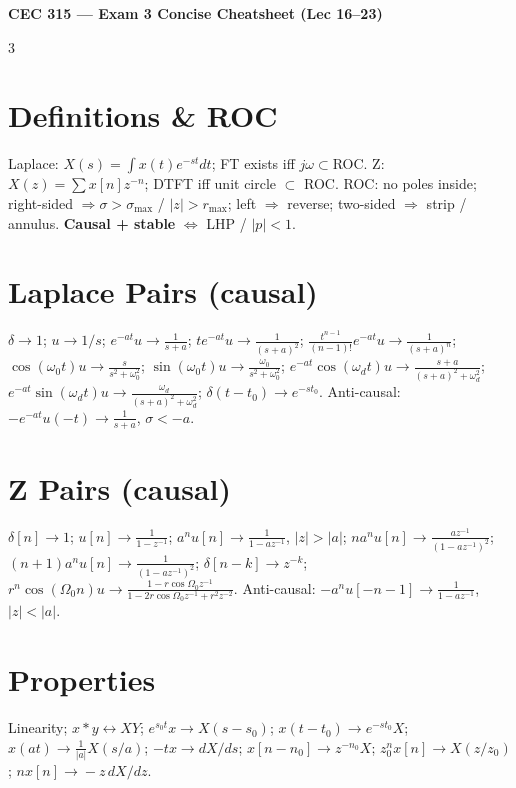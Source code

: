 \documentclass[9pt,landscape]{extarticle}
\begin{document}
\scriptsize
\begin{center}\textbf{CEC 315 --- Exam 3 Concise Cheatsheet (Lec 16--23)}\end{center}

\begin{multicols*}{3}

\section*{Definitions \& ROC}
Laplace: $X(s)=\!\int x(t)e^{-st}dt$; FT exists iff $j\omega\!\subset\!$ROC.
Z: $X(z)=\!\sum x[n]z^{-n}$; DTFT iff unit circle $\subset$ ROC.
ROC: no poles inside; right-sided $\Rightarrow \sigma>\sigma_{\max}$ / $|z|>r_{\max}$; left $\Rightarrow$ reverse; two-sided $\Rightarrow$ strip / annulus. \textbf{Causal + stable} $\Leftrightarrow$ LHP / $|p|<1$.

\section*{Laplace Pairs (causal)}
$\delta\!\to\!1$; $u\!\to\!1/s$; $e^{-at}u\!\to\!\tfrac{1}{s+a}$; $te^{-at}u\!\to\!\tfrac{1}{(s+a)^2}$; $\tfrac{t^{n-1}}{(n-1)!}e^{-at}u\!\to\!\tfrac{1}{(s+a)^n}$; $\cos(\omega_0 t)u\!\to\!\tfrac{s}{s^2+\omega_0^2}$; $\sin(\omega_0 t)u\!\to\!\tfrac{\omega_0}{s^2+\omega_0^2}$; $e^{-at}\cos(\omega_d t)u\!\to\!\tfrac{s+a}{(s+a)^2+\omega_d^2}$; $e^{-at}\sin(\omega_d t)u\!\to\!\tfrac{\omega_d}{(s+a)^2+\omega_d^2}$; $\delta(t{-}t_0)\!\to\!e^{-st_0}$. Anti-causal: $-e^{-at}u(-t)\!\to\!\tfrac{1}{s+a}$, $\sigma<-a$.

\section*{Z Pairs (causal)}
$\delta[n]\!\to\!1$; $u[n]\!\to\!\tfrac{1}{1-z^{-1}}$; $a^nu[n]\!\to\!\tfrac{1}{1-az^{-1}}$, $|z|>|a|$; $na^nu[n]\!\to\!\tfrac{az^{-1}}{(1-az^{-1})^2}$; $(n{+}1)a^nu[n]\!\to\!\tfrac{1}{(1-az^{-1})^2}$; $\delta[n-k]\!\to\!z^{-k}$; $r^n\cos(\Omega_0 n)u\!\to\!\tfrac{1-r\cos\Omega_0 z^{-1}}{1-2r\cos\Omega_0 z^{-1}+r^2z^{-2}}$. Anti-causal: $-a^nu[-n{-}1]\!\to\!\tfrac{1}{1-az^{-1}}$, $|z|<|a|$.

\section*{Properties}
Linearity; $x*y\leftrightarrow XY$; $e^{s_0 t}x\!\to\!X(s{-}s_0)$; $x(t{-}t_0)\!\to\!e^{-st_0}X$; $x(at)\!\to\!\tfrac{1}{|a|}X(s/a)$; $-tx\!\to\!dX/ds$; $x[n{-}n_0]\!\to\!z^{-n_0}X$; $z_0^nx[n]\!\to\!X(z/z_0)$; $nx[n]\!\to\!-z\,dX/dz$.


\end{multicols*}
\end{document}
